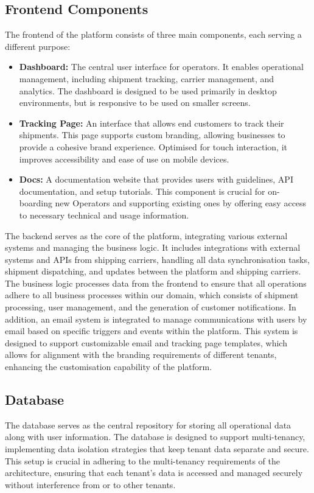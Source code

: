 \subsection{Frontend Components}
The frontend of the platform consists of three main components, each serving a different purpose:

\begin{itemize}
    \item \textbf{Dashboard:} The central user interface for operators. 
    It enables operational management, including shipment tracking, carrier management, and analytics. 
    The dashboard is designed to be used primarily in desktop environments, but is responsive to be used on smaller screens.
    \item \textbf{Tracking Page:} An interface that allows end customers to track their shipments. 
    This page supports custom branding, allowing businesses to provide a cohesive brand experience. 
    Optimised for touch interaction, it improves accessibility and ease of use on mobile devices.
    \item \textbf{Docs:} A documentation website that provides users with guidelines, API documentation, and setup tutorials.
    This component is crucial for on-boarding new Operators and supporting existing ones by offering easy access to necessary technical and usage information.
\end{itemize}

The backend serves as the core of the platform, integrating various external systems and managing the business logic. 
It includes integrations with external systems and APIs from shipping carriers, handling all data synchronisation tasks, shipment dispatching, and updates between the platform and shipping carriers. 
The business logic processes data from the frontend to ensure that all operations adhere to all business processes within our domain, which consists of shipment processing, user management, and the generation of customer notifications. 
In addition, an email system is integrated to manage communications with users by email based on specific triggers and events within the platform. 
This system is designed to support customizable email and tracking page templates, which allows for alignment with the branding requirements of different tenants, enhancing the customisation capability of the platform.

\subsection{Database}
The database serves as the central repository for storing all operational data along with user information. 
The database is designed to support multi-tenancy, implementing data isolation strategies that keep tenant data separate and secure. This setup is crucial in adhering to the multi-tenancy requirements of the architecture, ensuring that each tenant's data is accessed and managed securely without interference from or to other tenants.

